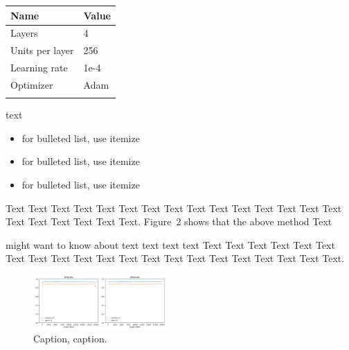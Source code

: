 \documentclass{bioinfo}
\begin{document}
\begin{methods}
\begin{table}[!t]
 {
\begin{tabular}{@{}ll@{}}
\toprule Name & Value \\
\midrule
Layers & 4\\
Units per layer & 256\\
Learning rate & 1e-4\\
Optimizer & Adam\\
\botrule
\end{tabular}}{}
\end{table}

text\vspace*{1pt}

\begin{itemize}
\item for bulleted list, use itemize
\item for bulleted list, use itemize
\item for bulleted list, use itemize\vspace*{1pt}
\end{itemize}

Text Text Text Text Text Text  Text Text Text Text Text Text Text
Text Text  Text Text Text Text Text Text.
Figure~2\vphantom{\ref{fig:02}} shows that the above method  Text

\citealp{Boffelli03} might want to know about  text text text text
Text Text Text Text Text Text  Text Text Text Text Text Text Text
Text Text  Text Text Text Text Text Text.

\end{methods}

\begin{figure}[!tpb]
	\centerline{\includegraphics[width=0.45\textwidth]{images/length_wise_bias}}
\caption{Caption, caption.}\label{fig:length_wise_bias}
\end{figure}

\end{document}

